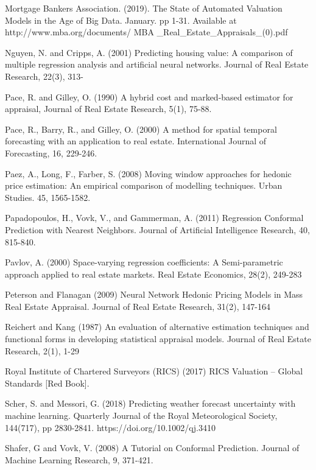 \documentclass[colTwo]{anon}
\theoremstyle{definition}
\begin{document}
\begin{thebibliography}{50}
\harvarditem{}{}{}Mortgage Bankers Association. (2019). The State of Automated Valuation Models in the Age of Big Data. January. pp 1-31. Available at http://www.mba.org/documents/ MBA \_Real\_Estate\_Appraisals\_(0).pdf

\harvarditem{}{}{}Nguyen, N. and Cripps, A. (2001) Predicting housing value: A comparison of multiple regression analysis and artificial neural networks. Journal of Real Estate Research, 22(3), 313-

\harvarditem{}{}{}Pace, R. and Gilley, O. (1990) A hybrid cost and marked-based estimator for appraisal, Journal of Real Estate Research, 5(1), 75-88. 

\harvarditem{}{}{}Pace, R., Barry, R., and Gilley, O. (2000) A method for spatial temporal forecasting with an application to real estate.  International Journal of Forecasting, 16, 229-246. 

\harvarditem{}{}{}Paez, A., Long, F., Farber, S. (2008) Moving window approaches for hedonic price estimation: An empirical comparison of modelling techniques. Urban Studies. 45, 1565-1582. 

\harvarditem{}{}{} Papadopoulos, H., Vovk, V., and Gammerman, A. (2011) Regression Conformal Prediction with Nearest Neighbors. Journal of Artificial Intelligence Research, 40, 815-840.

\harvarditem{}{}{}Pavlov, A. (2000) Space-varying regression coefficients: A Semi-parametric approach applied to real estate markets. Real Estate Economics, 28(2), 249-283

\harvarditem{}{}{}Peterson and Flanagan (2009) Neural Network Hedonic Pricing Models in Mass Real Estate Appraisal. Journal of Real Estate Research,  31(2), 147-164

\harvarditem{}{}{}Reichert and Kang (1987) An evaluation of alternative estimation techniques and functional forms in developing statistical appraisal models. Journal of Real Estate Research, 2(1), 1-29

\harvarditem{}{}{}Royal Institute of Chartered Surveyors (RICS) (2017) RICS Valuation – Global Standards [Red Book]. 

\harvarditem{}{}{}Scher, S. and Messori, G. (2018) Predicting weather forecast uncertainty with machine learning. Quarterly Journal of the Royal Meteorological Society, 144(717), pp 2830-2841.  https://doi.org/10.1002/qj.3410

\harvarditem{}{}{}Shafer, G and Vovk, V. (2008) A Tutorial on Conformal Prediction. Journal of Machine Learning Research, 9, 371-421. 


\end{thebibliography}
\end{document}
